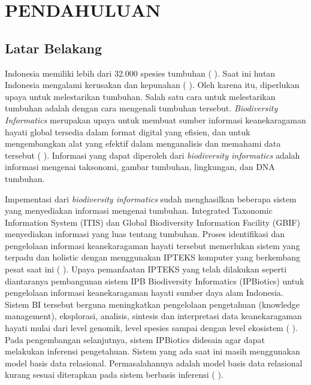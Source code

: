 \section*{PENDAHULUAN} %
\subsection*{Latar Belakang}
Indonesia memiliki lebih dari 32.000 spesies tumbuhan (\citeauthor{BAPPENAS2003} \cite*{BAPPENAS2003}). Saat ini hutan Indonesia mengalami kerusakan dan kepunahan (\citeauthor{ZUHUD2008} \cite*{ZUHUD2008}). Oleh karena itu, diperlukan upaya untuk melestarikan tumbuhan. Salah satu cara untuk melestarikan tumbuhan adalah dengan cara mengenali tumbuhan tersebut. \textit{Biodiversity Informatics} merupakan upaya untuk membuat sumber informasi keanekaragaman hayati global tersedia dalam format digital yang efisien, dan untuk mengembangkan alat yang efektif dalam menganalisis dan memahami data tersebut (\citeauthor{GILLMANE2009} \cite*{GILLMANE2009}). Informasi yang dapat diperoleh dari \textit{biodiversity informatics} adalah informasi mengenai taksonomi, gambar tumbuhan, lingkungan, dan DNA tumbuhan. 

Impementasi dari \textit{biodiversity informatics} sudah menghasilkan beberapa sistem yang menyediakan informasi mengenai tumbuhan.  Integrated Taxonomic Information System  (ITIS) dan Global Biodiversity Information Facility (GBIF) menyediakan informasi yang luas tentang tumbuhan. Proses identifikasi dan pengelolaan informasi keanekaragaman hayati tersebut memerlukan sistem yang terpadu dan holistic dengan menggunakan IPTEKS komputer yang berkembang pesat saat ini (\citeauthor{HERDIYENI2013} \cite*{HERDIYENI2013}). Upaya pemanfaatan IPTEKS yang telah dilakukan seperti diantaranya pembangunan sistem IPB Biodiversity Informatics (IPBiotics) untuk pengelolaan informasi keanekaragaman hayati sumber daya alam Indonesia. Sistem BI tersebut berguna meningkatkan pengelolaan pengetahuan (knowledge management), eksplorasi, analisis, sintesis dan interpretasi data keanekaragaman hayati mulai dari level genomik, level spesies sampai dengan level ekosistem (\citeauthor{HERDIYENI2013} \cite*{HERDIYENI2013}). Pada pengembangan selanjutnya, sistem IPBiotics didesain agar dapat melakukan inferensi pengetahuan. Sistem yang ada saat ini masih menggunakan model basis data relasional. Permasalahannya adalah model basis data relasional kurang sesuai diterapkan pada sistem berbasis inferensi (\citeauthor{LAALLAM2013} \cite*{LAALLAM2013}).  

